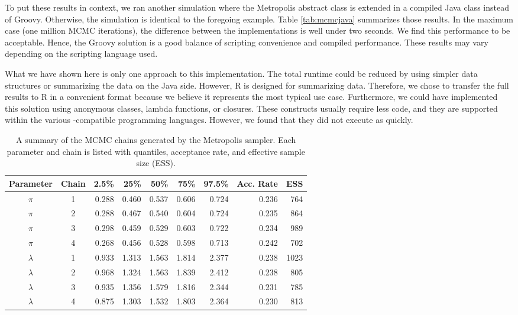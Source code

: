 To put these results in context, we ran another simulation where the Metropolis abstract class is extended in a compiled Java class instead of Groovy. Otherwise, the simulation is identical to the foregoing example. Table \ref{tab:mcmcjava} summarizes those results. In the maximum case (one million MCMC iterations), the difference between the implementations is well under two seconds. We find this performance to be acceptable. Hence, the Groovy solution is a good balance of scripting convenience and compiled performance. These results may vary depending on the scripting language used.

What we have shown here is only one approach to this implementation. The total runtime could be reduced by using simpler data structures or summarizing the data on the Java side. However, R is designed for summarizing data. Therefore, we chose to transfer the full results to R in a convenient format because we believe it represents the most typical use case. Furthermore, we could have implemented this solution using anonymous classes, lambda functions, or closures. These constructs usually require less code, and they are supported within the various -compatible programming languages. However, we found that they did not execute as quickly.


\begin{table}[h!]
\centering
\caption{A summary of the MCMC chains generated by the Metropolis sampler. Each parameter and chain is listed with quantiles, acceptance rate, and effective sample size (ESS).}
\begin{tabular}{ccrrrrrrr}
\toprule
Parameter & Chain & 2.5\% & 25\% & 50\% & 75\% & 97.5\% & Acc. Rate & ESS \\ \midrule
$\pi$ &    1 & 0.288 & 0.460 & 0.537 & 0.606 & 0.724 & 0.236 &  764 \\ 
$\pi$ &    2 & 0.288 & 0.467 & 0.540 & 0.604 & 0.724 & 0.235 &  864 \\ 
$\pi$ &    3 & 0.298 & 0.459 & 0.529 & 0.603 & 0.722 & 0.234 &  989 \\ 
$\pi$ &    4 & 0.268 & 0.456 & 0.528 & 0.598 & 0.713 & 0.242 &  702 \\ 
$\lambda$ &    1 & 0.933 & 1.313 & 1.563 & 1.814 & 2.377 & 0.238 & 1023 \\ 
$\lambda$ &    2 & 0.968 & 1.324 & 1.563 & 1.839 & 2.412 & 0.238 &  805 \\ 
$\lambda$ &    3 & 0.935 & 1.356 & 1.579 & 1.816 & 2.344 & 0.231 &  785 \\ 
$\lambda$ &    4 & 0.875 & 1.303 & 1.532 & 1.803 & 2.364 & 0.230 &  813 \\ \bottomrule
\end{tabular}
\label{tab:mcmcx}
\end{table}

